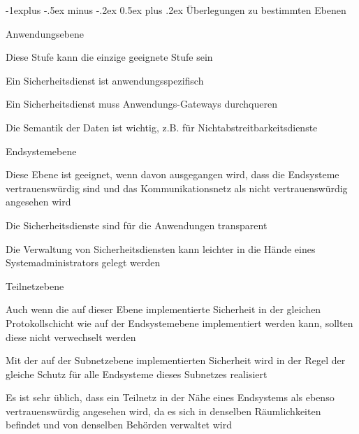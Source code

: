 \documentclass[a4paper]{article}
\makeatletter
\renewcommand{\subsection}{\@startsection{subsection}{2}{0mm}%
 {-1explus -.5ex minus -.2ex}%
 {0.5ex plus .2ex}%
 {\normalfont\normalsize\bfseries}}
\makeatother
\begin{document}
\begin{multicols}{3}
      \subsection{Überlegungen zu bestimmten Ebenen}
      \begin{itemize*}
            \item Anwendungsebene
            \begin{itemize*}
                  \item Diese Stufe kann die einzige geeignete Stufe sein
                  \item Ein Sicherheitsdienst ist anwendungsspezifisch%
                  \item Ein Sicherheitsdienst muss Anwendungs-Gateways durchqueren%
                  \item Die Semantik der Daten ist wichtig, z.B. für Nichtabstreitbarkeitsdienste %
            \end{itemize*}
            \item Endsystemebene
            \begin{itemize*}
                  \item Diese Ebene ist geeignet, wenn davon ausgegangen wird, dass die Endsysteme vertrauenswürdig sind und das Kommunikationsnetz als nicht vertrauenswürdig angesehen wird
                  \item Die Sicherheitsdienste sind für die Anwendungen transparent
                  \item Die Verwaltung von Sicherheitsdiensten kann leichter in die Hände eines Systemadministrators gelegt werden
            \end{itemize*}
            \item Teilnetzebene
            \begin{itemize*}
                  \item Auch wenn die auf dieser Ebene implementierte Sicherheit in der gleichen Protokollschicht wie auf der Endsystemebene implementiert werden kann, sollten diese nicht verwechselt werden
                  \item Mit der auf der Subnetzebene implementierten Sicherheit wird in der Regel der gleiche Schutz für alle Endsysteme dieses Subnetzes realisiert
                  \item Es ist sehr üblich, dass ein Teilnetz in der Nähe eines Endsystems als ebenso vertrauenswürdig angesehen wird, da es sich in denselben Räumlichkeiten befindet und von denselben Behörden verwaltet wird

\end{itemize*}
\end{itemize*}
\end{multicols}
\end{document}
